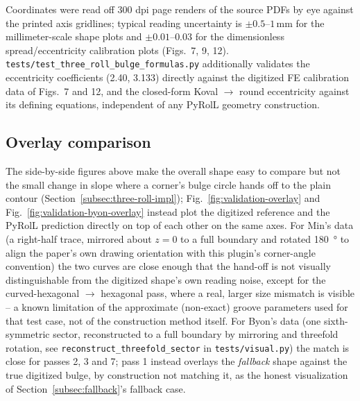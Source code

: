 \documentclass[11pt]{PyRollDocs}
\begin{document}
    Coordinates were read off 300 dpi page renders of the source PDFs by eye against
    the printed axis gridlines; typical reading uncertainty is $\pm 0.5$--$1$\,mm
    for the millimeter-scale shape plots and $\pm 0.01$--$0.03$ for the dimensionless
    spread/eccentricity calibration plots (Figs.~7, 9, 12).
    \texttt{tests/test\_three\_roll\_bulge\_formulas.py} additionally validates the
    eccentricity coefficients (\num{2.40}, \num{3.133}) directly against the digitized
    FE calibration data of Figs.~7 and 12, and the closed-form Koval $\to$ round
    eccentricity against its defining equations, independent of any PyRolL geometry
    construction.

    \subsection{Overlay comparison}\label{subsec:validation-overlay}

    The side-by-side figures above make the overall shape easy to compare but not the
    small change in slope where a corner's bulge circle hands off to the plain contour
    (Section~\ref{subsec:three-roll-impl}); Fig.~\ref{fig:validation-overlay} and
    Fig.~\ref{fig:validation-byon-overlay} instead plot the digitized reference and
    the PyRolL prediction directly on top of each other on the same axes. For Min's
    data (a right-half trace, mirrored about $z=0$ to a full boundary and rotated
    \SI{180}{\degree} to align the paper's own drawing orientation with this plugin's
    corner-angle convention) the two curves are close enough that the hand-off is not
    visually distinguishable from the digitized shape's own reading noise, except for
    the curved-hexagonal $\to$ hexagonal pass, where a real, larger size mismatch is
    visible -- a known limitation of the approximate (non-exact) groove parameters used
    for that test case, not of the construction method itself. For Byon's data (one
    sixth-symmetric sector, reconstructed to a full boundary by mirroring and
    threefold rotation, see \texttt{reconstruct\_threefold\_sector} in
    \texttt{tests/visual.py}) the match is close for passes 2, 3 and 7; pass 1 instead
    overlays the \emph{fallback} shape against the true digitized bulge, by
    construction not matching it, as the honest visualization of
    Section~\ref{subsec:fallback}'s fallback case.
\end{document}
